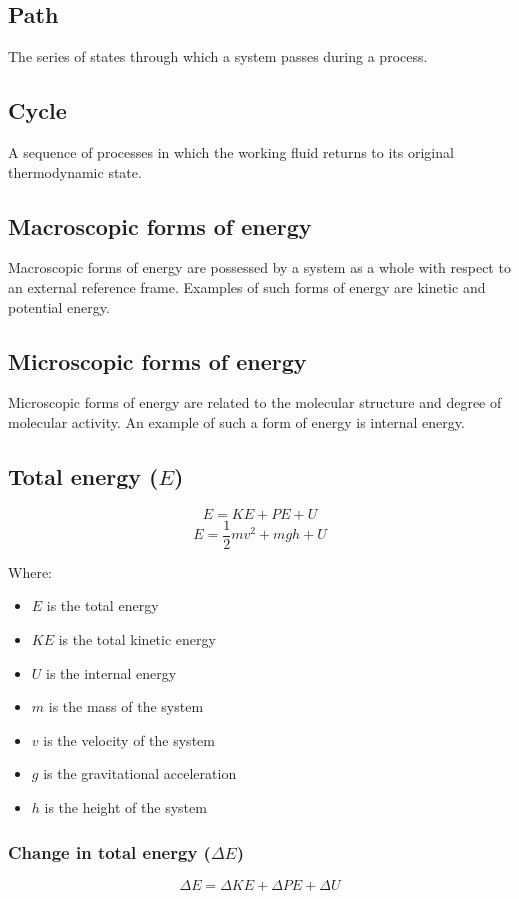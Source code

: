 \documentclass[11pt]{article}
\begin{document}
\subsection{Path}
\label{sec:orge56c7af}
The series of states through which a system passes during a process.

\subsection{Cycle}
\label{sec:org52756f8}
A sequence of processes in which the working fluid returns to its original thermodynamic state.

\subsection{Macroscopic forms of energy}
\label{sec:orgf6e329e}
Macroscopic forms of energy are possessed by a system as a whole with respect to an external reference frame. Examples of such forms of energy are kinetic and potential energy.

\subsection{Microscopic forms of energy}
\label{sec:org39b8312}
Microscopic forms of energy are related to the molecular structure and degree of molecular activity. An example of such a form of energy is internal energy.

\newpage

\subsection{Total energy (\(E\))}
\label{sec:orgda14446}
\[E = KE + PE + U\]
\[E = \frac{1}{2} mv^2 + mgh + U\]

Where:
\begin{itemize}
\item \(E\) is the total energy
\item \(KE\) is the total kinetic energy
\item \(U\) is the internal energy
\item \(m\) is the mass of the system
\item \(v\) is the velocity of the system
\item \(g\) is the gravitational acceleration
\item \(h\) is the height of the system
\end{itemize}

\subsubsection{Change in total energy (\(\Delta E\))}
\label{sec:orgc86ec8e}
\[\Delta E = \Delta KE + \Delta PE + \Delta U\]
\end{document}
